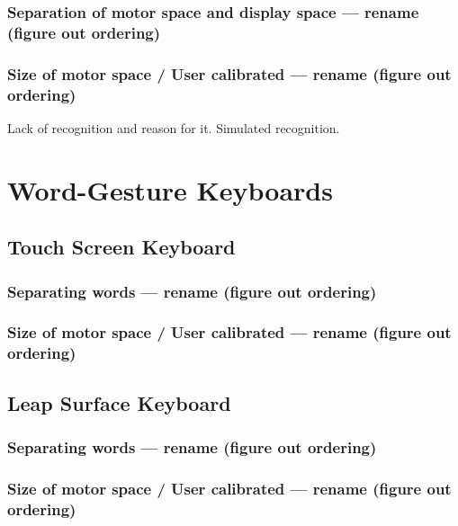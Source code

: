 \subsubsection{Separation of motor space and display space --- rename (figure out ordering)}

\subsubsection{Size of motor space / User calibrated --- rename (figure out ordering)}



Lack of recognition and reason for it. Simulated recognition.

\section{Word-Gesture Keyboards}

\subsection{Touch Screen Keyboard}

\subsubsection{Separating words --- rename (figure out ordering)}

\subsubsection{Size of motor space / User calibrated --- rename (figure out ordering)}




\subsection{Leap Surface Keyboard}

\subsubsection{Separating words --- rename (figure out ordering)}

\subsubsection{Size of motor space / User calibrated --- rename (figure out ordering)}





